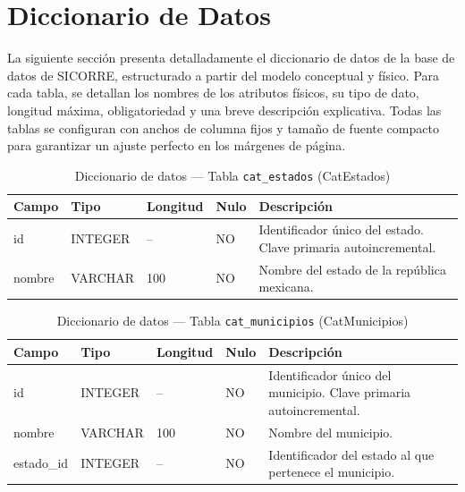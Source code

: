 \clearpage

\section{Diccionario de Datos}

La siguiente sección presenta detalladamente el diccionario de datos de la base de datos de SICORRE, estructurado a partir del modelo conceptual y físico. Para cada tabla, se detallan los nombres de los atributos físicos, su tipo de dato, longitud máxima, obligatoriedad y una breve descripción explicativa. Todas las tablas se configuran con anchos de columna fijos y tamaño de fuente compacto para garantizar un ajuste perfecto en los márgenes de página.
\begin{table}[H]
	\centering
	\caption{Diccionario de datos --- Tabla \texttt{cat\_estados} (CatEstados)}
	\label{tab:data-dict-cat_estados}
	\scriptsize
	\begin{tabular}{>{\ttfamily\raggedright\arraybackslash}p{3.6cm} p{1.6cm} p{1.3cm} p{0.7cm} p{5.6cm}}
		\toprule
		\textbf{Campo} & \textbf{Tipo} & \textbf{Longitud} & \textbf{Nulo} & \textbf{Descripción} \\
		\midrule
		id & INTEGER & -- & NO & Identificador único del estado. Clave primaria autoincremental. \\
		nombre & VARCHAR & 100 & NO & Nombre del estado de la república mexicana. \\
		\bottomrule
	\end{tabular}
\end{table}

\begin{table}[H]
	\centering
	\caption{Diccionario de datos --- Tabla \texttt{cat\_municipios} (CatMunicipios)}
	\label{tab:data-dict-cat_municipios}
	\scriptsize
	\begin{tabular}{>{\ttfamily\raggedright\arraybackslash}p{3.6cm} p{1.6cm} p{1.3cm} p{0.7cm} p{5.6cm}}
		\toprule
		\textbf{Campo} & \textbf{Tipo} & \textbf{Longitud} & \textbf{Nulo} & \textbf{Descripción} \\
		\midrule
		id & INTEGER & -- & NO & Identificador único del municipio. Clave primaria autoincremental. \\
		nombre & VARCHAR & 100 & NO & Nombre del municipio. \\
		estado\_id & INTEGER & -- & NO & Identificador del estado al que pertenece el municipio. \\
		\bottomrule
	\end{tabular}
\end{table}

